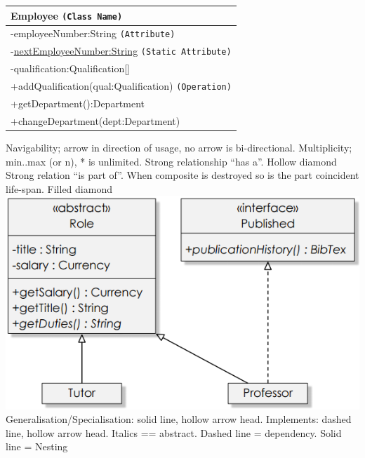\documentclass[number]{assignment}
\begin{document}
\begin{landscape}
\begin{multicols}{3}
\begin{tabular}{|l|}
\hline\small
Employee \texttt{(Class Name)}\\\hline
-employeeNumber:String \texttt{(Attribute)}\\
-\underline{nextEmployeeNumber:String} \texttt{(Static Attribute)}\\
-qualification:Qualification[]\\\hline
+addQualification(qual:Qualification) \texttt{(Operation)}\\
+getDepartment():Department\\
+changeDepartment(dept:Department)\\\hline
\end{tabular}
\small Navigability; arrow in direction of usage, no arrow is bi-directional. Multiplicity; min..max (or n), * is unlimited.
\small Strong relationship ``has a''. Hollow diamond
\small Strong relation ``is part of''. When composite is destroyed so is the part coincident life-span. Filled diamond
\includegraphics[width=\linewidth]{inheritance.png}
\small Generalisation/Specialisation: solid line, hollow arrow head. Implements: dashed line, hollow arrow head. Italics == abstract.
\small Dashed line = dependency. Solid line = Nesting


\end{multicols}
\end{landscape}
\end{document}
